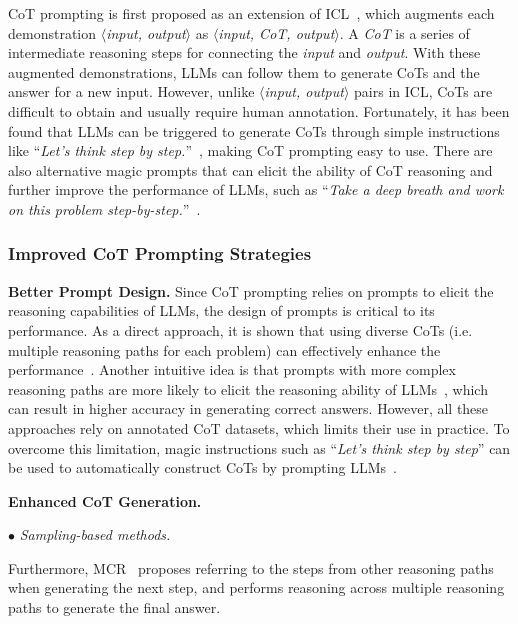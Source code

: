 {{{{{{CoT prompting is first proposed as an extension of ICL~\cite{Wei-arxiv-2022-chain}, which augments each demonstration $\langle$\emph{input, output}$\rangle$ as $\langle$\emph{input, CoT, output}$\rangle$.
A \textit{CoT} is a series of intermediate reasoning steps for connecting the \textit{input} and \textit{output}.
With these augmented demonstrations, LLMs can follow them to {generate CoTs and the answer for a new input.} However, unlike $\langle$\emph{input, output}$\rangle$ pairs in ICL, CoTs are difficult to obtain and usually require human annotation. Fortunately, it has been found that LLMs can be triggered to generate CoTs through simple instructions like ``\emph{Let's think step by step.}''~\cite{Kojima-arxiv-2022-Large}, making CoT prompting easy to use. There are also alternative magic prompts that {can elicit the ability of CoT reasoning and further improve the performance of LLMs}, such as ``\emph{Take a deep breath and work on this problem step-by-step.}''~\cite{Yang-CoRR-2023-Large}.

\subsubsection{Improved CoT Prompting Strategies}

\textbf{Better Prompt Design.} Since CoT prompting relies on prompts to elicit the reasoning capabilities of LLMs, the design of prompts is critical to its performance. As a direct approach, it is shown that using diverse CoTs (i.e. multiple reasoning paths for each problem) can effectively enhance the performance~\cite{Li-arxiv-2022-On}. Another intuitive idea is that prompts with more complex reasoning paths are more likely to elicit the reasoning ability of LLMs~\cite{Fu-arxiv-2022-Complexity}, which can result in higher accuracy in generating correct answers. However, all these approaches rely on annotated CoT datasets, which limits their use in practice. To overcome this limitation, magic instructions such as  ``\emph{Let's think step by step}'' can be used to automatically construct CoTs by prompting LLMs~\cite{Zhang-arxiv-2022-Automatic}. 

\textbf{Enhanced CoT Generation.}

$\bullet$ \emph{Sampling-based methods.}

{Furthermore, MCR~\cite{Yoran-arxiv-2023-Answering} proposes referring to the steps from other reasoning paths when generating the next step, and performs reasoning across multiple reasoning paths to generate the final answer.} }

}}}}}
